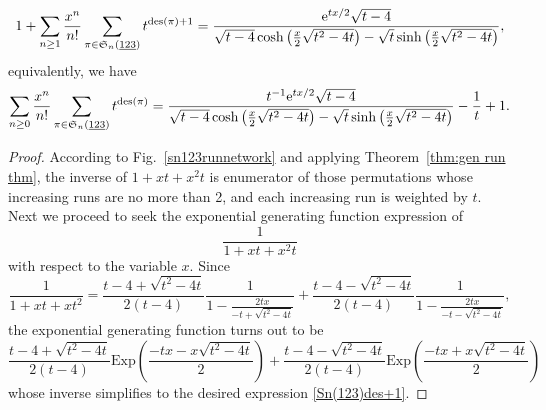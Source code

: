 \begin{theorem}
\begin{align}\label{Sn(123)des+1}
1+\sum_{n\geq 1}\dfrac{x^n}{n!}\sum_{\pi \in \S_n(\underline{123})} t^{\mathrm{des}(\pi)+1}=\dfrac{\mathrm{e}^{tx/2}\sqrt{t-4}}{\sqrt{t-4}\cosh {\left(\frac{x}{2}\sqrt{t^2-4t}\right)}-\sqrt{t}\sinh{\left(\frac{x}{2}\sqrt{t^2-4t}\right)}},
\end{align}
equivalently, we have
\begin{align}\label{Sn(123)des}
	\sum_{n\geq 0}\dfrac{x^n}{n!}\sum_{\pi \in \S_n(\underline{123})} t^{\mathrm{des}(\pi)}=\dfrac{t^{-1}\mathrm{e}^{tx/2}\sqrt{t-4}}{\sqrt{t-4}\cosh {\left(\frac{x}{2}\sqrt{t^2-4t}\right)}-\sqrt{t}\sinh{\left(\frac{x}{2}\sqrt{t^2-4t}\right)}}-\dfrac{1}{t}+1.
\end{align}
\end{theorem}

\begin{proof}
According to Fig.~\ref{sn123runnetwork} and applying Theorem~\ref{thm:gen run thm}, the inverse of $1+xt+x^2t$ is enumerator of those permutations whose increasing runs are no more than 2, and each increasing run is weighted by $t$. Next we proceed to seek the exponential generating function expression of $$\frac{1}{1+xt+x^2t}$$ with respect to the variable $x$. Since 
$$\dfrac{1}{1+xt+xt^2}=\dfrac{t-4+\sqrt{t^2-4t}}{2\left(t-4\right)}\dfrac{1}{1-\frac{2tx}{-t+\sqrt{t^2-4t}}}+\dfrac{t-4-\sqrt{t^2-4t}}{2(t-4)}\dfrac{1}{1-\frac{2tx}{-t-\sqrt{t^2-4t}}},$$ 
the exponential generating function turns out to be 
$$\frac{t-4+\sqrt{t^2-4t}}{2\left(t-4\right)} \mathrm{Exp}\left(\frac{-tx-x\sqrt{t^2-4t}}{2}\right)+\frac{t-4-\sqrt{t^2-4t}}{2\left(t-4\right)} \mathrm{Exp}\left(\frac{-tx+x\sqrt{t^2-4t}}{2}\right)$$
whose inverse simplifies to the desired expression \eqref{Sn(123)des+1}.
\end{proof}


